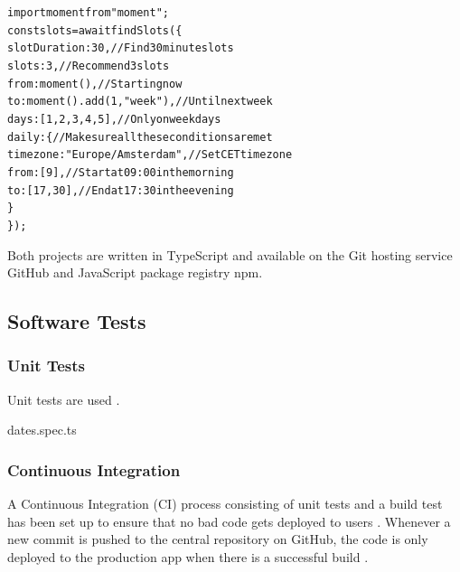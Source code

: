 \documentclass{article}
\begin{document}
\begin{alltt}
\textcolor{keyword}{import} moment from \textcolor{string}{"moment"};
\textcolor{keyword}{const} slots = \textcolor{keyword}{await} \textcolor{variable}{findSlots}(\{
  \textcolor{symbol}{slotDuration}: \textcolor{literal}{30}, \textcolor{comment}{// Find 30 minute slots}
  \textcolor{symbol}{slots}: \textcolor{literal}{3}, \textcolor{comment}{// Recommend 3 slots}
  \textcolor{symbol}{from}: moment(), \textcolor{comment}{// Starting now}
  \textcolor{symbol}{to}: moment().\textcolor{variable}{add}(\textcolor{literal}{1}, \textcolor{string}{"week"}), \textcolor{comment}{// Until next week}
  \textcolor{symbol}{days}: [\textcolor{literal}{1}, \textcolor{literal}{2}, \textcolor{literal}{3}, \textcolor{literal}{4}, \textcolor{literal}{5}], \textcolor{comment}{// Only on week days}
  \textcolor{symbol}{daily}: \{ \textcolor{comment}{// Make sure all these conditions are met}
    \textcolor{symbol}{timezone}: \textcolor{string}{"Europe/Amsterdam"}, \textcolor{comment}{// Set CET timezone}
    \textcolor{symbol}{from}: [\textcolor{literal}{9}], \textcolor{comment}{// Start at 09:00 in the morning}
    \textcolor{symbol}{to}: [\textcolor{literal}{17}, \textcolor{literal}{30}], \textcolor{comment}{// End at 17:30 in the evening}
  \}
\});
\end{alltt}

Both projects are written in TypeScript and available on the Git hosting service GitHub and JavaScript package registry npm.

\subsection{Software Tests}

\subsubsection{Unit Tests}

Unit tests are used \cite{tosun_effectiveness_2018}.

dates.spec.ts

\subsubsection{Continuous Integration}

A Continuous Integration (CI) process consisting of unit tests and a build test has been set up to ensure that no bad code gets deployed to users \cite{li_extensive_2020}. Whenever a new commit is pushed to the central repository on GitHub, the code is only deployed to the production app when there is a successful build \cite{noauthor_what_2019}.
\end{document}
